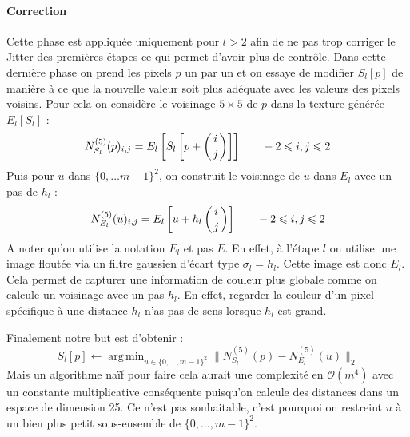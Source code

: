 \documentclass[12pt]{article}
\DeclareMathOperator*{\argmin}{arg\,min}
\begin{document}
\paragraph{Correction}
Cette phase est appliquée uniquement pour $l > 2$ afin de ne pas trop corriger le Jitter des premières étapes ce qui permet d'avoir plus de contrôle. Dans cette dernière phase on prend les pixels $p$ un par un et on essaye de modifier $S_l[p]$ de manière à ce que la nouvelle valeur soit plus adéquate avec les valeurs des pixels voisins. Pour cela on considère le voisinage $5 \times 5$ de $p$ dans la texture générée $E_l[S_l]$ :
$$ N_{S_l}^{(5)}(p)_{i, j} = E_l \left[ S_l \left[ p + \left( i \atop j \right) \right] \right] \qquad -2 \leqslant i, j \leqslant 2 $$
Puis pour $u$ dans $\{ 0, \dots m-1 \}^2$, on construit le voisinage de $u$ dans $E_l$ avec un pas de $h_l$ :
$$ N_{E_l}^{(5)}(u)_{i, j} = E_l \left[ u + h_l \left( i \atop j \right) \right] \qquad -2 \leqslant i, j \leqslant 2 $$
A noter qu'on utilise la notation $E_l$ et pas $E$. En effet, à l'étape $l$ on utilise une image floutée via un filtre gaussien d'écart type $\sigma_l = h_l$. Cette image est donc $E_l$. Cela permet de capturer une information de couleur plus globale comme on calcule un voisinage avec un pas $h_l$. En effet, regarder la couleur d'un pixel spécifique à une distance $h_l$ n'as pas de sens lorsque $h_l$ est grand.

Finalement notre but est d'obtenir :
$$ S_l[p] \gets \argmin_{ u \in \{ 0, \dots, m-1 \}^2 } \| N_{S_l}^{(5)}(p) - N_{E_l}^{(5)}(u) \|_2 $$
Mais un algorithme naïf pour faire cela aurait une complexité en $\mathcal{O}(m^4)$ avec un constante multiplicative conséquente puisqu'on calcule des distances dans un espace de dimension 25. Ce n'est pas souhaitable, c'est pourquoi on restreint $u$ à un bien plus petit sous-ensemble de $\{ 0, \dots, m-1 \}^2$.
\end{document}
